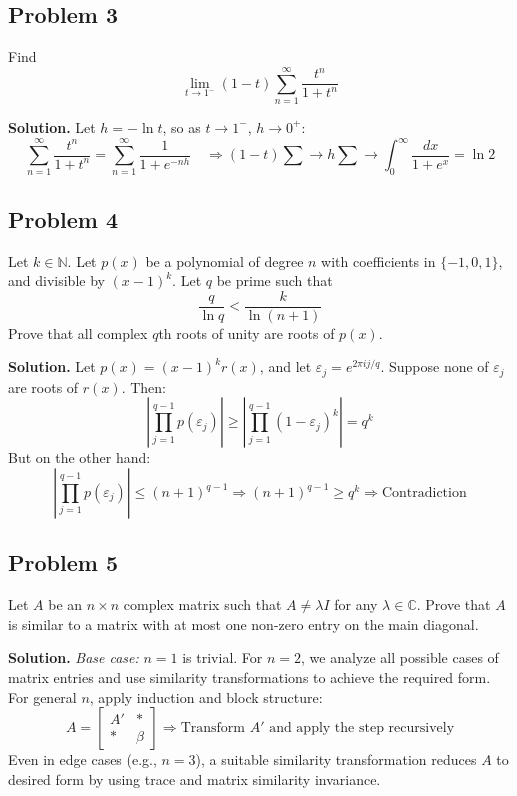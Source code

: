 \documentclass{article}
\begin{document}
\subsection*{Problem 3}

Find
\[
\lim_{t \to 1^-} (1 - t) \sum_{n=1}^{\infty} \frac{t^n}{1 + t^n}
\]

\textbf{Solution.}
Let \( h = -\ln t \), so as \( t \to 1^- \), \( h \to 0^+ \):
\[
\sum_{n=1}^\infty \frac{t^n}{1 + t^n}
= \sum_{n=1}^\infty \frac{1}{1 + e^{-nh}} \quad \Rightarrow
(1 - t) \sum \to h \sum \to \int_0^\infty \frac{dx}{1 + e^x} = \ln 2
\]

\subsection*{Problem 4}

Let \( k \in \mathbb{N} \). Let \( p(x) \) be a polynomial of degree \( n \) with coefficients in \( \{-1, 0, 1\} \), and divisible by \( (x - 1)^k \). Let \( q \) be prime such that
\[
\frac{q}{\ln q} < \frac{k}{\ln(n+1)}
\]
Prove that all complex \( q \)th roots of unity are roots of \( p(x) \).

\textbf{Solution.}
Let \( p(x) = (x - 1)^k r(x) \), and let \( \varepsilon_j = e^{2\pi i j/q} \). Suppose none of \( \varepsilon_j \) are roots of \( r(x) \). Then:
\[
\left| \prod_{j=1}^{q-1} p(\varepsilon_j) \right| \geq \left| \prod_{j=1}^{q-1} (1 - \varepsilon_j)^k \right| = q^k
\]
But on the other hand:
\[
\left| \prod_{j=1}^{q-1} p(\varepsilon_j) \right| \leq (n + 1)^{q - 1}
\Rightarrow (n+1)^{q-1} \geq q^k \Rightarrow \text{Contradiction}
\]

\subsection*{Problem 5}

Let \( A \) be an \( n \times n \) complex matrix such that \( A \ne \lambda I \) for any \( \lambda \in \mathbb{C} \). Prove that \( A \) is similar to a matrix with at most one non-zero entry on the main diagonal.

\textbf{Solution.}
\emph{Base case:} \( n = 1 \) is trivial. For \( n = 2 \), we analyze all possible cases of matrix entries and use similarity transformations to achieve the required form. For general \( n \), apply induction and block structure:
\[
A = \begin{bmatrix}
A' & * \\
* & \beta
\end{bmatrix}
\Rightarrow \text{Transform } A' \text{ and apply the step recursively}
\]
Even in edge cases (e.g., \( n = 3 \)), a suitable similarity transformation reduces \( A \) to desired form by using trace and matrix similarity invariance.
\end{document}
